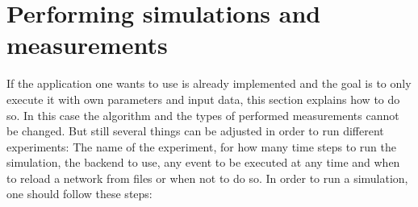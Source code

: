 \documentclass[11pt,fleqn]{book} %
\begin{document}
\section{Performing simulations and measurements}\label{sec:Simulation_Measurements}
If the application one wants to use is already implemented and the goal is to only execute it with own parameters and input data, this section explains how to do so. In this case the algorithm and the types of performed measurements cannot be changed. But still several things can be adjusted in order to run different experiments: The name of the experiment, for how many time steps to run the simulation, the backend to use, any event to be executed at any time and when to reload a network from files or when not to do so. In order to run a simulation, one should follow these steps:
\end{document}
